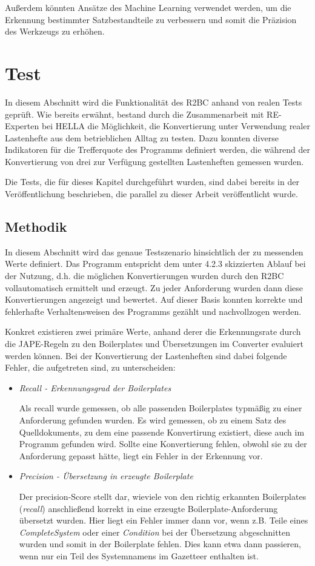 \documentclass[12pt]{report}
\begin{document}
Außerdem könnten Ansätze des Machine Learning verwendet werden, um die Erkennung bestimmter Satzbestandteile zu verbessern und somit die Präzision des Werkzeugs zu erhöhen.
\section{Test}
In diesem Abschnitt wird die Funktionalität des R2BC anhand von realen Tests geprüft. Wie bereits erwähnt, bestand durch die Zusammenarbeit mit RE-Experten bei HELLA die Möglichkeit, die Konvertierung unter Verwendung realer Lastenhefte aus dem betrieblichen Alltag zu testen. Dazu konnten diverse Indikatoren für die Trefferquote des Programms definiert werden, die während der Konvertierung von drei zur Verfügung gestellten Lastenheften gemessen wurden.

Die Tests, die für dieses Kapitel durchgeführt wurden, sind dabei bereits in der Veröffentlichung \cite{zh19} beschrieben, die parallel zu dieser Arbeit veröffentlicht wurde.

\subsection{Methodik}
In diesem Abschnitt wird das genaue Testszenario hinsichtlich der zu messenden Werte definiert. Das Programm entspricht dem unter 4.2.3 skizzierten Ablauf bei der Nutzung, d.h. die möglichen Konvertierungen wurden durch den R2BC vollautomatisch ermittelt und erzeugt. Zu jeder Anforderung wurden dann diese Konvertierungen angezeigt und bewertet. Auf dieser Basis konnten korrekte und fehlerhafte Verhaltensweisen des Programms gezählt und nachvollzogen werden.

Konkret existieren zwei primäre Werte, anhand derer die Erkennungsrate durch die JAPE-Regeln zu den Boilerplates und Übersetzungen im Converter evaluiert werden können. Bei der Konvertierung der Lastenheften sind dabei folgende Fehler, die aufgetreten sind, zu unterscheiden:
\begin{itemize}
\item \textit{Recall - Erkennungsgrad der Boilerplates} 

Als recall wurde gemessen, ob alle passenden Boilerplates typmäßig zu einer Anforderung gefunden wurden. Es wird gemessen, ob zu einem Satz des Quelldokuments, zu dem eine passende Konvertirung existiert, diese auch im Programm gefunden wird. Sollte eine Konvertierung fehlen, obwohl sie zu der Anforderung gepasst hätte, liegt ein Fehler in der Erkennung vor.

\item \textit{Precision - Übersetzung in erzeugte Boilerplate} 

Der precision-Score stellt dar, wieviele von den richtig erkannten Boilerplates (\textit{recall}) anschließend korrekt in eine erzeugte Boilerplate-Anforderung übersetzt wurden. Hier liegt ein Fehler immer dann vor, wenn z.B. Teile eines \textit{CompleteSystem} oder einer \textit{Condition} bei der Übersetzung abgeschnitten wurden und somit in der Boilerplate fehlen. Dies kann etwa dann passieren, wenn nur ein Teil des Systemnamens im Gazetteer enthalten ist. 
\end{itemize}
\end{document}
